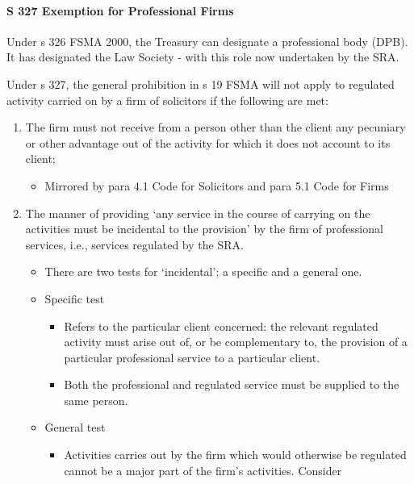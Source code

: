\documentclass[
]{article}
\providecommand{\tightlist}{%
  \setlength{\itemsep}{0pt}\setlength{\parskip}{0pt}}
\begin{document}
\hypertarget{s-327-exemption-for-professional-firms}{%
\paragraph{S 327 Exemption for Professional
Firms}\label{s-327-exemption-for-professional-firms}}

Under s 326 FSMA 2000, the Treasury can designate a professional body
(DPB). It has designated the Law Society - with this role now undertaken
by the SRA.

Under s 327, the general prohibition in s 19 FSMA will not apply to
regulated activity carried on by a firm of solicitors if the following
are met:

\begin{enumerate}
\def\labelenumi{\arabic{enumi}.}
\tightlist
\item
  The firm must not receive from a person other than the client any
  pecuniary or other advantage out of the activity for which it does not
  account to its client;

  \begin{itemize}
  \tightlist
  \item
    Mirrored by para 4.1 Code for Solicitors and para 5.1 Code for Firms
  \end{itemize}
\item
  The manner of providing `any service in the course of carrying on the
  activities must be incidental to the provision' by the firm of
  professional services, i.e., services regulated by the SRA.

  \begin{itemize}
  \tightlist
  \item
    There are two tests for `incidental'; a specific and a general one.
  \item
    Specific test

    \begin{itemize}
    \tightlist
    \item
      Refers to the particular client concerned: the relevant regulated
      activity must arise out of, or be complementary to, the provision
      of a particular professional service to a particular client.
    \item
      Both the professional and regulated service must be supplied to
      the same person.
    \end{itemize}
  \item
    General test

    \begin{itemize}
    \tightlist
    \item
      Activities carries out by the firm which would otherwise be
      regulated cannot be a major part of the firm's activities.
      Consider


\end{itemize}
\end{itemize}
\end{enumerate}
\end{document}

